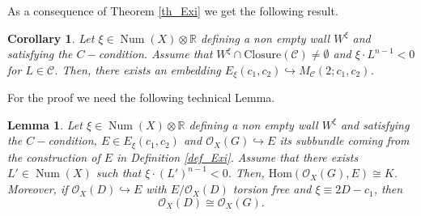 \documentclass[11pt,twoside]{amsart}
\newtheorem{lemma}[theorem]{Lemma}
\newtheorem{corollary}[theorem]{Corollary}
\theoremstyle{definition}
\newcommand {\Hom}{\mathrm{Hom}}
\newcommand {\Closure}{\mathrm{Closure}}
\newcommand{\Num}{\operatorname{Num}}
\begin{document}
As a consequence of Theorem \ref{th_Exi} we get the following result.


\begin{corollary}
\label{cor_inclusion}
    Let $\xi\in\Num(X)\otimes\mathbb{R}$ defining a non empty wall $W^{\xi}$ and satisfying the $C-$condition. Assume that $W^{\xi}\cap \Closure(\mathcal{C})\neq\emptyset$ and $\xi\cdot L^{n-1}<0$ for  $L\in\mathcal{C}$.  Then, there exists an embedding $E_{\xi}(c_1,c_2)\hookrightarrow M_{\mathcal{C}}(2;c_1,c_2)$. %
\end{corollary}

For the proof we need the following technical Lemma.

\begin{lemma}
\label{lemma_aut}
    Let $\xi\in \Num(X)\otimes\mathbb{R}$  defining a non empty wall $W^{\xi}$ and satisfying the $C-$condition, $E\in E_{\xi}(c_1,c_2)$ and $\mathcal{O}_X(G)\hookrightarrow E$ its subbundle coming from the construction of $E$ in Definition \ref{def_Exi}. Assume that there exists $L'\in\Num(X)$ such that $\xi\cdot (L')^{n-1}<0$. Then, $\Hom(\mathcal{O}_X(G), E)\cong K$. Moreover, if $\mathcal{O}_X(D)\hookrightarrow E$ with $E/\mathcal{O}_X(D)$ torsion free and $\xi\equiv 2D-c_1$, then $$\mathcal{O}_X(D)\cong \mathcal{O}_X(G).$$
\end{lemma}
\end{document}
